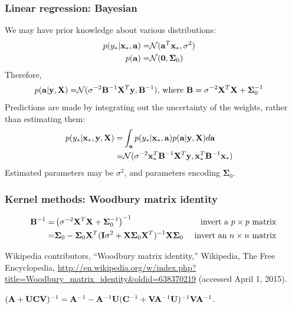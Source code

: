 \begin{frame}
\frametitle{Linear regression: Bayesian}
We may have prior knowledge about various distributions:
\begin{align*}
p(y_* | {\bf x}_*, {\bf a}) = & \mathcal{N}({\bf a}^T{\bf x}_*, \sigma^2)\cr
p({\bf a}) = & \mathcal{N}({\bf 0},\boldsymbol\Sigma_0)\cr
\end{align*}
Therefore,
\begin{align*}
p({\bf a}|{\bf y},{\bf X})  = & \mathcal{N}(\sigma^{-2}{\bf B}^{-1}{\bf X}^T{\bf y},{\bf B}^{-1}) \text{, where } {\bf B} = \sigma^{-2}{\bf X}^T{\bf X} + \boldsymbol\Sigma_0^{-1}
\end{align*}
Predictions are made by integrating out the uncertainty of the weights, rather than estimating them:
\begin{align*}
p(y_* | {\bf x}_*, {\bf y}, {\bf X}) = & \int_{\bf a} p(y_* | {\bf x}_*, {\bf a}) p({\bf a}|{\bf y},{\bf X}) d{\bf a}\cr
                                     = & \mathcal{N}(\sigma^{-2} {\bf x}_*^T {\bf B}^{-1} {\bf X}^T {\bf y}, {\bf x}_*^T{\bf B}^{-1}{\bf x}_*)
\end{align*}
Estimated parameters may be $\sigma^2$, and parameters encoding $\boldsymbol\Sigma_0$.
\end{frame}

\begin{frame}
\frametitle{Kernel methods: Woodbury matrix identity}
\begin{align*}
{\bf B}^{-1} = & \left(\sigma^{-2}{\bf X}^T{\bf X} + \boldsymbol\Sigma_0^{-1}\right)^{-1} & \text{ invert a } p \times p \text{ matrix}\\
             = & \boldsymbol\Sigma_0 - \boldsymbol\Sigma_0 {\bf X}^T({\bf I}\sigma^2 + {\bf X} \boldsymbol\Sigma_0 {\bf X}^T)^{-1} {\bf X} \boldsymbol\Sigma_0 & \text{ invert an } n \times n \text{ matrix}
\end{align*}

\vspace{0.25cm}
\begin{tiny}
Wikipedia contributors, ``Woodbury matrix identity,'' Wikipedia, The Free Encyclopedia, \url{http://en.wikipedia.org/w/index.php?title=Woodbury\_matrix\_identity\&oldid=638370219} (accessed April 1, 2015).\par
$({\bf A}+{\bf U}{\bf C}{\bf V})^{-1} = {\bf A}^{-1} - {\bf A}^{-1} {\bf U}({\bf C}^{-1} + {\bf V}{\bf A}^{-1}{\bf U})^{-1}{\bf V}{\bf A}^{-1}$.\par
\end{tiny}
\end{frame}

